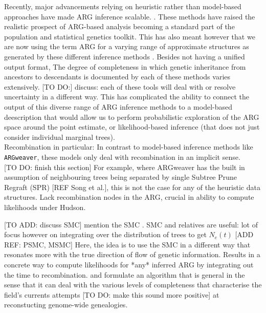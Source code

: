 \documentclass{article}
\newcommand{\argweaver}[0]{\texttt{ARGweaver}}
\begin{document}
Recently, major advancements relying on heuristic rather than model-based approaches
have made ARG inference scalable.
\citep{rasmussen_2014, kelleher_2019, speidel_2019, schaefer_2021, wohns_2022, 
zhang_biobank-scale_2023, zhan_towards_2023}. These methods
have raised the realistic prospect of ARG-based analysis becoming a standard 
part of the population and statistical genetics toolkit.
This has also meant however that
we are now using the term ARG for a varying range of approximate structures
as generated by these different inference methods \citep{wong_a-general_2023}. 
Besides not having a unified output format, The degree of completeness 
in which genetic inheritance from ancestors to 
descendants is documented by each of these methods varies extensively. 
[TO DO:] discuss: each of these tools will deal with or resolve uncertainty 
in a different way.
This has complicated the ability to connect the output of this diverse range of 
ARG inference methods to a model-based deescription that would allow us to perform  
probabilistic exploration of the ARG space around the point estimate, 
or likelihood-based inference (that does not just consider individual marginal trees).\\

Recombination in particular:
In contrast to model-based inference methods like \argweaver, 
these models only deal with recombination in an implicit sense.\\

[TO DO: finish this section] For example, where ARGweaver has 
the built in assumption of neighbouring trees being separated by single Subtree Prune 
Regraft (SPR) [REF Song et al.], this is not the case for any of the heuristic data 
structures.
Lack recombination nodes in the ARG, crucial in ability to compute likelihoods 
under Hudson. \citep{wong_a-general_2023}




[TO ADD: discuss SMC] mention the SMC \citep{mcvean_approximating_2004}.
SMC and relatives are useful: lot of focus however on integrating over 
the distribution of trees to get $N_e(t)$ [ADD REF: PSMC, MSMC]
Here, the idea is to use the SMC in a different way that resonates more 
with the true direction of flow of genetic information.
Results in a concrete way to compute likelihoods for *any* inferred ARG 
by integrating out the time to recombination.
and formulate an algorithm 
that is general in the sense that it can deal with the various levels of 
completeness that characterise the field's currents attempts [TO DO: make this sound more positive] 
at reconstucting genome-wide genealogies.
\end{document}
